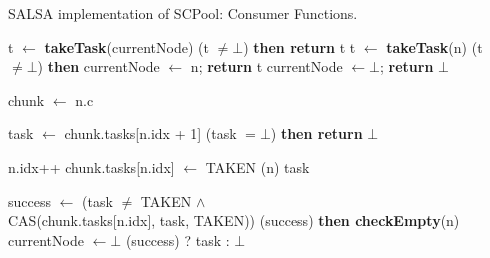 \begin{algo}[!ht]
\caption{SALSA implementation of SCPool: Consumer Functions.} 
\label{alg:non-fifo}
\scriptsize
\begin{minipage}[t]{0.48\textwidth}
\begin{distribalgo}[1]
\setcounter{ALC@line}{\value{alg:non-fifo:lines}}
\smallskip


		\STATE t $\leftarrow$ {\bf takeTask}(currentNode)
		 (t $\neq \bot$) {\bf then return} t
	\ENDINDENT
  			\STATE t $\leftarrow$ {\bf takeTask}(n)
				 (t $\neq \bot$) {\bf then} currentNode $\leftarrow$ n; {\bf return} t
			\ENDINDENT
	\ENDINDENT
	\STATE currentNode $\leftarrow \bot$; {\bf return} $\bot$
\ENDINDENT

\medskip

  \STATE chunk $\leftarrow$ n.c
 
  \STATE task $\leftarrow$ chunk.tasks[n.idx + 1]
   (task $= \bot$) {\bf then return} $\bot$ 
 	
 	\smallskip 
  \STATE n.idx++  \label{alg:lines:ind-inc}
 		\STATE chunk.tasks[n.idx] $\leftarrow$ TAKEN \label{alg:lines:fast-path}
  	(n)
  	 task 
  \ENDINDENT
  
  \smallskip
 	\STATE success $\leftarrow$ (task $\neq$ TAKEN $\wedge$ \\ \label{alg:lines:stolen-chunk-begin}
 		\hspace{0.5cm} CAS(chunk.tasks[n.idx], task, TAKEN)) \label{alg:line:cas-consumer}
 	(success) {\bf then checkEmpty}(n) 
	\STATE currentNode $\leftarrow \bot$
 	 (success) ? task : $\bot$ \label{alg:lines:stolen-chunk-end}
\ENDINDENT




\end{distribalgo}
\end{minipage}
\end{algo}
